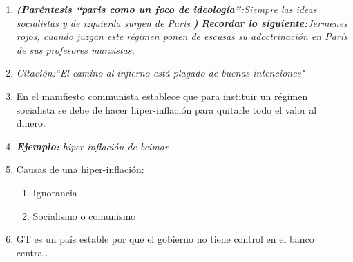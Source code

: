 \begin{enumerate}
        \item \emph{\textbf{(Paréntesis ``paris como un foco de ideología'':}Siempre las ideas socialistas y de izquierda surgen de París  \textbf{)}} \emph{\textbf{Recordar lo siguiente:}Jermenes rojos, cuando juzgan este régimen ponen de escusas su adoctrinación en París de sus profesores marxistas.}
        \item \emph{Citación:``El camino al infierno está plagado de buenas intenciones"}
        \item En el manifiesto communista establece que para instituir un régimen socialista se debe de hacer hiper-inflación para quitarle todo el valor al dinero. 
        \item \emph{\textbf{Ejemplo: }hiper-inflación de beimar}
        \item Causas de una hiper-inflación: 
            \begin{enumerate}
                \item Ignorancia
                \item Socialismo o comunismo
            \end{enumerate}
        
        \item GT es un país estable por que el gobierno no tiene control en el banco central.
\end{enumerate}
